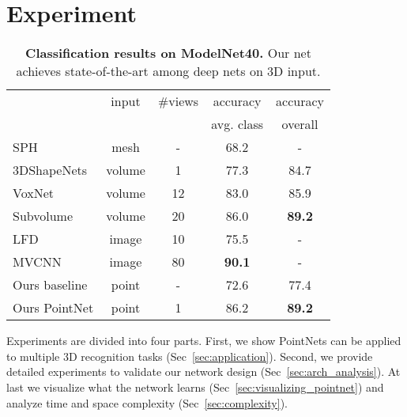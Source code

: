 \documentclass[10pt,twocolumn,letterpaper]{article}
\begin{document}
\begin{comment}
\end{comment} 
\section{Experiment}
\begin{table}[t!]
    \small
    \centering
    \begin{tabular}[width=\linewidth]{l|c|c|c|c}
    \hline
    ~               & input        & \#views    & accuracy & accuracy \\ 
    ~ & & & avg. class & overall \\ \hline
    SPH~\cite{kazhdan2003rotation}             & mesh        & - & 68.2         & -  \\ \hline
    3DShapeNets~\cite{wu20153d}     & volume       & 1        & 77.3  & 84.7 \\
    VoxNet~\cite{maturana2015voxnet}          & volume       & 12        & 83.0 & 85.9 \\
    Subvolume~\cite{qi2016volumetric}    & volume       & 20      & 86.0  & \textbf{89.2} \\ \hline
    LFD~\cite{wu20153d}             & image        & 10        & 75.5 & -\\
    MVCNN~\cite{su15mvcnn}           & image        & 80        & \textbf{90.1} & -\\ \hline
    Ours baseline  & point    & -     & 72.6  & 77.4\\
    Ours PointNet   & point   & 1        & 86.2 & \textbf{89.2} \\ \hline
    \end{tabular}
    \caption{\textbf{Classification results on ModelNet40.} Our net achieves state-of-the-art among deep nets on 3D input.}
    \label{tab:classification}
\end{table}
\label{sec:exp}
Experiments are divided into four parts. First, we show PointNets can be applied to multiple 3D recognition tasks (Sec~\ref{sec:application}). Second, we provide detailed experiments to validate our network design (Sec~\ref{sec:arch_analysis}). At last we visualize what the network learns (Sec~\ref{sec:visualizing_pointnet}) and analyze time and space complexity (Sec~\ref{sec:complexity}).
\end{document}
